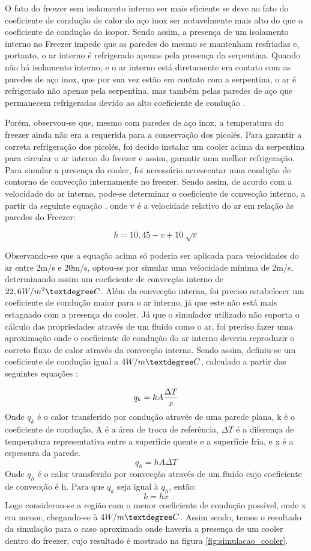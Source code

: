 \begin{itemize}
\par O fato do freezer sem isolamento interno ser mais eficiente se deve ao fato do coeficiente de condução de calor do aço inox ser notavelmente mais alto do que o coeficiente de condução do isopor. Sendo assim, a presença de um isolamento interno no Freezer impede que as paredes do mesmo se mantenham resfriadas e, portanto, o ar interno é refrigerado apenas pela presença da serpentina. Quando não há isolamento interno, e o ar interno está diretamente em contato com as paredes de aço inox, que por sua vez estão em contato com a serpentina, o ar é refrigerado não apenas pela serpentina, mas também pelas paredes de aço que permanecem refrigeradas devido ao alto coeficiente de condução \cite{coeficiente}.

\par Porém, observou-se que, mesmo com paredes de aço inox, a temperatura do freezer ainda não era a requerida para a conservação dos picolés. Para garantir a correta refrigeração dos picolés, foi decido instalar um cooler acima da serpentina para circular o ar interno do freezer e assim, garantir uma melhor refrigeração. Para simular a presença do cooler, foi necessário acrescentar uma condição de contorno de convecção internamente no freezer. Sendo assim, de acordo com a velocidade do ar interno, pode-se determinar o coeficiente de convecção interno, a partir da seguinte equação \cite{convection}, onde v é a velocidade relativo do ar em relação às paredes do Freezer:

$$
    h = 10,45 - v + 10 \sqrt[]{v}
$$

Observando-se que a equação acima só poderia ser aplicada para velocidades do ar entre 2m/s e 20m/s, optou-se por simular uma velocidade mínima de 2m/s, determinando assim um coeficiente de convecção interno de $22,6 W/m^2\textdegree C $. Além da convecção interna, foi preciso estabelecer um coeficiente de condução maior para o ar interno, já que este não está mais estagnado com a presença do cooler. Já que o simulador utilizado não suporta o cálculo das propriedades através de um fluido como o ar, foi preciso fazer uma aproximação onde o coeficiente de condução do ar interno deveria reproduzir o correto fluxo de calor através da convecção interna. Sendo assim, definiu-se um coeficiente de condução igual a $4 W/m\textdegree C$, calculado a partir das seguintes equações \cite{equacoesCOEF}:

$$
    q_k = kA {\Delta T\over x}
$$
Onde $q_k$ é o calor transferido por condução através de uma parede plana, k é o coeficiente de condução, A é a área de troca de referência, $ \Delta T$ é a diferença de temperatura representativa entre a superfície quente e a superfície fria, e x é a espessura da parede.
$$
    q_h = hA \Delta T
$$
Onde $q_h$ é o calor transferido por convecção através de um fluido cujo coeficiente de convecção é h.
Para que $q_k$ seja igual à $q_h$, então:
$$
    k = hx
$$
Logo considerou-se a região com o menor coeficiente de condução possível, onde x era menor, chegando-se à $4 W/m\textdegree C$. Assim sendo, temos o resultado da simulação para o caso aproximado onde haveria a presença de um cooler dentro do freezer, cujo resultado é mostrado na figura \ref{fig:simulacao_cooler}.


\end{itemize}
